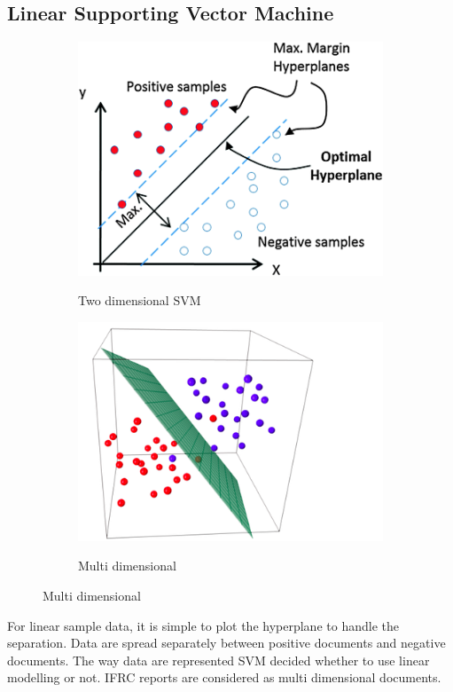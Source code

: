 \subsection{Linear Supporting Vector Machine }
\newpage
\begin{figure}
        \begin{subfigure}{.6\textwidth}
         \includegraphics[scale=.3]    	          {images/linear.png} \label{linear}
         \caption{Two dimensional SVM}
        \end{subfigure}%
        \begin{subfigure}{\textwidth}
                \includegraphics[scale=.5]    	                 {images/multi.png}
                \label{multi}
   \caption{Multi dimensional}\end{subfigure}


\end{figure}
For linear sample data, it is simple to plot the hyperplane to handle the separation.  Data are spread separately between positive documents and negative documents. The way data are represented SVM decided  whether to use linear modelling or not. IFRC reports are considered as multi dimensional documents.

